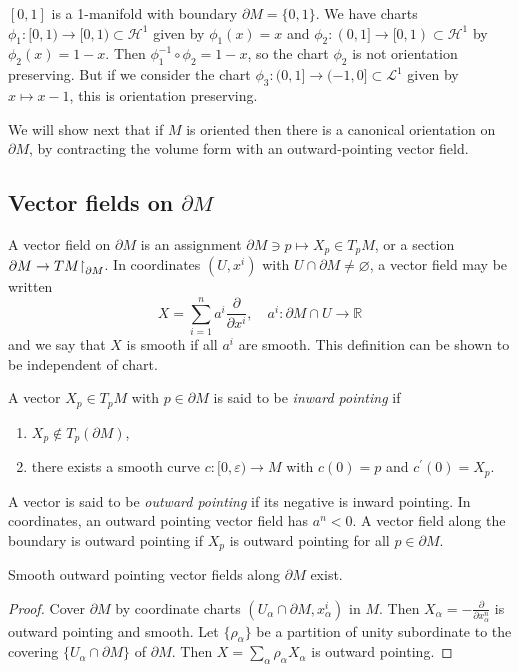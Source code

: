 \begin{xmpl}
$[0, 1]$ is a 1-manifold with boundary $\partial M = \{0, 1\}$. We
have charts $\phi_1: [0, 1) \to [0, 1) \subset \mathcal{H}^1$ given by
$\phi_1(x) = x$ and
$\phi_2: (0, 1] \to [0, 1) \subset \mathcal{H}^1$ by
$\phi_2(x) = 1 - x$. Then $\phi_1^{-1} \circ \phi_2 = 1 - x$, so the
chart $\phi_2$ is not orientation preserving. But if we consider the
chart $\phi_3 : (0, 1] \to (-1, 0] \subset \mathcal{L}^1$ given by $x
\mapsto x - 1$, this is orientation preserving.
\end{xmpl}

We will show next that if $M$ is oriented then there is a canonical
orientation on $\partial M$, by contracting the volume form with an
outward-pointing vector field.

\subsection{Vector fields on $\partial M$}
A vector field on $\partial M$ is an assignment
$\partial M \ni p \mapsto X_p \in T_p M$, or a section
$\partial M \to TM\mathord{\upharpoonright}_{\partial M}$. In coordinates
$(U, x^i)$ with $U \cap \partial M \neq \varnothing$,
a vector field may be written
$$
  X
= \sum_{i=1}^n
    a^i \frac{\partial}{\partial x^i}, \quad
a^i: \partial M \cap U \to \mathbb{R}
$$
and we say that $X$ is smooth if all $a^i$ are smooth. This definition
can be shown to be independent of chart.

\begin{defn}
A vector $X_p \in T_p M$ with $p \in \partial M$ is said to be
\emph{inward pointing} if
\begin{enumerate}
  \item{
    $X_p \notin T_p(\partial M)$,
  }
  \item{
    there exists a smooth curve $c : [0, \varepsilon) \to M$ with
    $c(0) = p$ and $c^\prime(0) = X_p$.
  }
\end{enumerate}
A vector is said to be \emph{outward pointing} if its negative is
inward pointing. In coordinates, an outward pointing vector field has
$a^n < 0$. A vector field along the boundary is outward pointing if
$X_p$ is outward pointing for all $p \in \partial M$.
\end{defn}

\begin{prop}
Smooth outward pointing vector fields along $\partial M$ exist.
\end{prop}
\begin{proof}
Cover $\partial M$ by coordinate charts
$(U_\alpha \cap \partial M, x_\alpha^i)$ in $M$. Then
$X_\alpha = -\frac{\partial}{\partial x_\alpha^n}$ is outward pointing and
smooth. Let $\{\rho_\alpha\}$ be a partition of unity subordinate to
the covering $\{U_\alpha \cap \partial M\}$ of $\partial M$. Then
$X = \sum_\alpha \rho_\alpha X_\alpha$ is outward pointing.
\end{proof}

